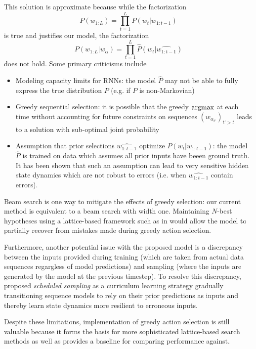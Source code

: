 This solution is approximate because while the factorization
\begin{equation}
  P(w_{1:L}) = \prod_{t=1}^L P(w_t | w_{1:t-1})
\end{equation}
is true and justifies our model, the factorization
\begin{equation}
  P(w_{1:L} | w_{\alpha}) = \prod_{t=1}^L \hat{P}(w_t | \hat{w_{1:t-1}} )
\end{equation}
does not hold. Some primary criticisms include
\begin{itemize}
  \item Modeling capacity limits for RNNs: the model $\hat{P}$ may not be able to fully express
    the true distribution $P$ (e.g. if $P$ is non-Markovian)
  \item Greedy sequential selection: it is possible that the greedy $\operatorname*{argmax}$ at each
    time without accounting for future constraints on sequences $(w_{\alpha_{t'}})_{t' > t}$
    leads to a solution with sub-optimal joint probability
  \item Assumption that prior selections $\hat{w_{1:t-1}}$ optimize $P(w_t | w_{1:t-1})$:
    the model $\hat{P}$ is trained on data which assumes all prior inputs have beeen
    ground truth. It has been shown  that such an assumption can lead to
    very sensitive hidden state dynamics which are not robust to errors (i.e. when
    $\hat{w_{1:t-1}}$ contain errors).
\end{itemize}
Beam search is one way to mitigate the effects of greedy selection: our current
method is equivalent to a beam search with width one. Maintaining $N$-best
hypotheses using a lattice-based framework such as in \citet{liu2014efficient}
would allow the model to partially recover from mistakes made during greedy
action selection.

Furthermore, another potential issue with the proposed model is a discrepancy
between the inputs provided during training (which are taken from actual data
sequences regargless of model predictions) and sampling (where the inputs are
generated by the model at the previous timestep). To resolve this discrepancy,
\citet{bengio2015scheduled} proposed \emph{scheduled sampling} as a curriculum
learning strategy gradually transitioning sequence models to rely on their
prior predictions as inputs and thereby learn state dynamics more resilient to
erroneous inputs.

Despite these limitations, implementation of greedy action selection is still
valuable because it forms the basis for more sophisticated lattice-based search
methods as well as provides a baseline for comparing performance against.

